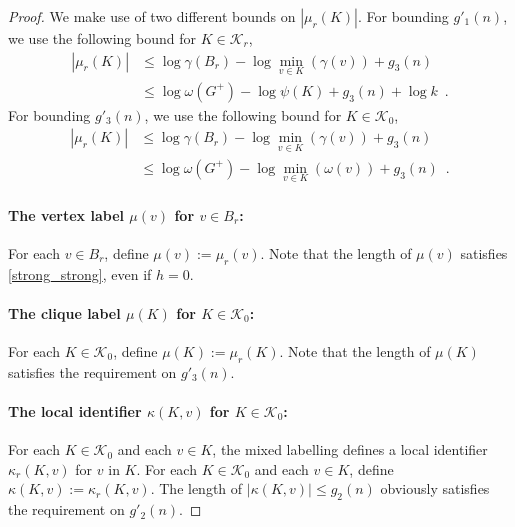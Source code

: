 \documentclass{patmorin}
\renewcommand{\le}{\leqslant}
\newcommand{\pat}[1]{\textcolor{Magenta}{PaMo: #1}}
\let\eqref\cref
\begin{document}
\begin{proof}
    We make use of two different bounds on $|\mu_r(K)|$.  For bounding $g'_1(n)$,
    we use the following bound for $K\in\mathcal{K}_r$,
    \begin{align*}
       |\mu_r(K)|
       & \le\log \gamma(B_r) - \log \min_{v\in K}(\gamma(v)) + g_3(n) \\
       & \le \log \omega(G^+) - \log\psi(K) + g_3(n) + \log k \enspace .
    \end{align*}
    For bounding $g'_3(n)$, we use the following bound for $K\in\mathcal{K}_0$,
    \begin{align*}
       |\mu_r(K)|
       & \le\log \gamma(B_r) - \log\min_{v\in K}(\gamma(v)) + g_3(n) \\
       & \le \log \omega(G^+) - \log\min_{v\in K}(\omega(v)) + g_3(n)  \enspace .
    \end{align*}

    \paragraph{\boldmath The vertex label $\mu(v)$ for $v\in B_r$:}
    For each $v\in B_r$, define $\mu(v) := \mu_r(v)$.
    Note that the length of $\mu(v)$ satisfies \eqref{strong_strong}, even if $h=0$.

    \paragraph{\boldmath The clique label $\mu(K)$ for $K\in\mathcal{K}_0$:}  For each $K\in\mathcal{K}_0$, define $\mu(K) := \mu_r(K)$.
    Note that the length of $\mu(K)$ satisfies the requirement on $g'_3(n)$.

    \paragraph{\boldmath The local identifier $\kappa(K,v)$ for $K\in\mathcal{K}_0$:}  For each $K\in\mathcal{K}_0$ and each $v\in K$, the mixed labelling defines a local identifier $\kappa_r(K,v)$ for $v$ in $K$.
    For each $K\in\mathcal{K}_0$ and each $v\in K$, define $\kappa(K,v):=\kappa_r(K,v)$.  The length of $|\kappa(K,v)|\le g_2(n)$ obviously satisfies the requirement on $g'_2(n)$.



\end{proof}
\end{document}
